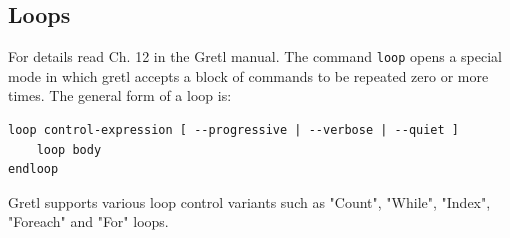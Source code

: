 \documentclass[11pt]{article}
\newcommand{\remph}[1]{{\color{myred}#1}}
\begin{document}


%


\subsection{Loops}
For details read Ch. 12 in the Gretl manual. The command \texttt{loop} opens a special mode in which gretl accepts a block of commands to be repeated zero or more times. The general form of a loop is:
\begin{Verbatim}[baselinestretch=0.75, fontsize=\small]
loop control-expression [ --progressive | --verbose | --quiet ]
	loop body
endloop
\end{Verbatim}
Gretl supports various loop control variants such as "Count", "While", "Index", "Foreach" and "For" loops. 
\end{document}
